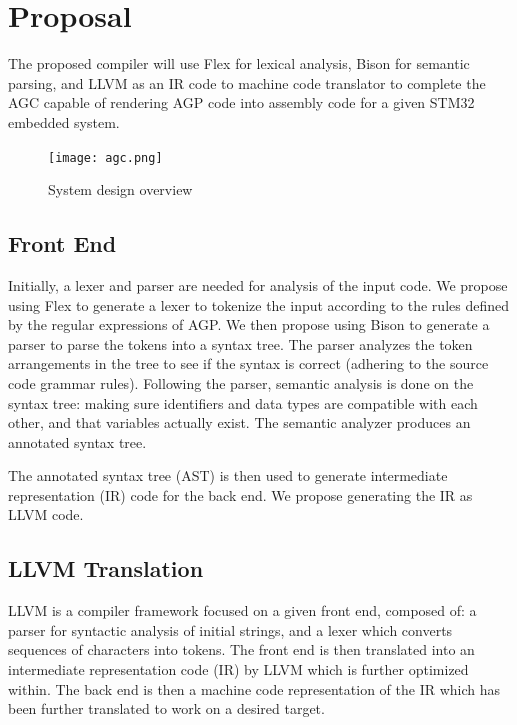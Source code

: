 \documentclass[11pt]{article}
\begin{document}
\section{Proposal}

The proposed compiler will use Flex for lexical analysis, Bison for semantic parsing, and  LLVM as an IR code to machine code translator to complete the AGC capable of rendering AGP code into assembly code for a given STM32 embedded system. 



\begin{figure}[hbt]
   \begin{center}
     \texttt{[image: agc.png]}
   \end{center}
  \caption{System design overview}
  \label{fig-sysdesov}
  \end{figure}



\subsection{Front End}

Initially, a lexer and parser are needed for analysis of the input code. We propose using Flex to generate a lexer to tokenize the input according to the rules defined by the regular expressions of AGP. We then propose using Bison to generate a parser to parse the tokens into a syntax tree. The parser analyzes the token arrangements in the tree to see if the syntax is correct (adhering to the source code grammar rules). Following the parser, semantic analysis is done  on the syntax tree: making sure identifiers and data types are compatible with each other, and that variables actually exist. The semantic analyzer produces an annotated syntax tree.

The annotated syntax tree (AST) is then used to generate intermediate representation (IR) code for the back end. We propose generating the IR as LLVM code.


\subsection{LLVM Translation}

LLVM is a compiler framework focused on a given front end, composed of: a parser for syntactic analysis of initial strings,  and a lexer which converts sequences of characters into tokens. The front end is then translated into an intermediate representation code (IR) by LLVM which is further optimized within. The back end is then a machine code representation of the IR which has been further translated to work on a desired target.
\end{document}
